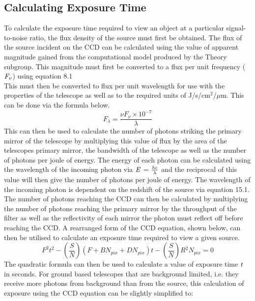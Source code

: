 \documentclass[pdf,color]{UoBnote}
\begin{document}
\subsection{Calculating Exposure Time}
To calculate the exposure time required to view an object at a particular signal-to-noise ratio, the flux density of the source must first be obtained. The flux of the source incident on the CCD can be calculated using the value of apparent magnitude gained from the computational model produced by the Theory subgroup. This magnitude must first be converted to a flux per unit frequency ($\it{F_\nu}$) using equation 8.1\\
\newline
This must then be converted to flux per unit wavelength for use with the properties of the telescope as well as to the required units of J/s/cm$^2$/$\mu$m. This can be done via the formula below.\\
\newline
\begin{equation}
F_\lambda = \frac{\nu F_\nu \times 10^{-7}}{\lambda}
\end{equation}
\newline
This can then be used to calculate the number of photons striking the primary mirror of the telescope by multiplying this value of flux by the area of the telescopes primary mirror, the bandwidth of the telescope as well as the number of photons per joule of energy. The energy of each photon can be calculated using the wavelength of the incoming photon via $\it{E}$ = $\frac{\it{hc}}{\lambda}$ and the reciprocal of this value will then give the number of photons per joule of energy. The wavelength of the incoming photon is dependent on the redshift of the source via equation 15.1. The number of photons reaching the CCD can then be calculated by multiplying the number of photons reaching the primary mirror by the throughput of the filter as well as the reflectivity of each mirror the photon must reflect off before reaching the CCD. A rearranged form of the CCD equation, shown below, can then be utilised to calculate an exposure time required to view a given source.\\
\newline
\begin{equation}
F^2t^2 - (\frac{S}{N})(F + BN_{pix} + DN_{pix})t - (\frac{S}{N})R{^2}N_{pix} = 0  
\end{equation}
\newline
The quadratic formula can then be used to calculate a value of exposure time $\it{t}$ in seconds. For ground based telescopes that are background limited, i.e. they receive more photons from background than from the source, this calculation of exposure using the CCD equation can be slightly simplified to:\\
\end{document}
